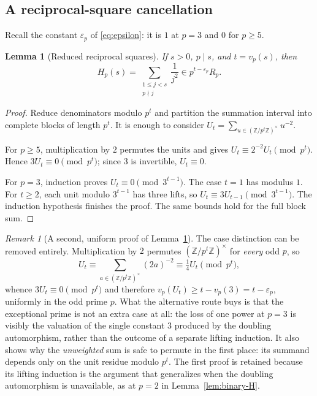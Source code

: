 \documentclass[11pt,a4paper]{article}
\numberwithin{equation}{section}
\newtheorem{lemma}[theorem]{Lemma}
\theoremstyle{definition}
\theoremstyle{remark}
\newtheorem{remark}[theorem]{Remark}
\newcommand{\Z}{\mathbb Z}
\newcommand{\eps}{\varepsilon}
\begin{document}
\subsection{A reciprocal-square cancellation}
Recall the constant $\eps_p$ of \eqref{eq:epsilon}: it is $1$ at $p=3$ and
$0$ for $p\ge5$.

\begin{lemma}[Reduced reciprocal squares]\label{lem:squares}
If $s>0$, $p\mid s$, and $t=v_p(s)$, then
\begin{equation}\label{eq:Hs}
 H_p(s)=\sum_{\substack{1\le j<s\\p\nmid j}}\frac1{j^2}
 \in p^{t-\eps_p}R_p.
\end{equation}
\end{lemma}
\begin{proof}
Reduce denominators modulo $p^t$ and partition the summation interval into
complete blocks of length $p^t$. It is enough to consider
$U_t=\sum_{u\in(\Z/p^t\Z)^\times}u^{-2}$.

For $p\ge5$, multiplication by $2$ permutes the units and gives
$U_t\equiv 2^{-2}U_t\pmod{p^t}$. Hence $3U_t\equiv0\pmod{p^t}$; since
$3$ is invertible, $U_t\equiv0$.

For $p=3$, induction proves $U_t\equiv0\pmod{3^{t-1}}$. The case $t=1$
has modulus $1$. For $t\ge2$, each unit modulo $3^{t-1}$ has three lifts,
so $U_t\equiv3U_{t-1}\pmod{3^{t-1}}$. The induction hypothesis finishes
the proof. The same bounds hold for the full block sum.
\end{proof}

\begin{remark}[A second, uniform proof of Lemma~\ref{lem:squares}]
\label{rem:squares-alt}
The case distinction can be removed entirely. Multiplication by $2$ permutes
$(\Z/p^t\Z)^\times$ for \emph{every} odd $p$, so
\[
 U_t\equiv\sum_{a\in(\Z/p^t\Z)^\times}(2a)^{-2}
 \equiv\tfrac14U_t\pmod{p^t},
\]
whence $3U_t\equiv0\pmod{p^t}$ and therefore
$v_p(U_t)\ge t-v_p(3)=t-\eps_p$, uniformly in the odd prime $p$. What the
alternative route buys is that the exceptional prime is not an extra case at
all: the loss of one power at $p=3$ is visibly the valuation of the single
constant $3$ produced by the doubling automorphism, rather than the outcome
of a separate lifting induction. It also shows why the \emph{unweighted} sum
is safe to permute in the first place: its summand depends only on the unit
residue modulo $p^t$. The first proof is retained because its lifting
induction is the argument that generalizes when the doubling automorphism is
unavailable, as at $p=2$ in Lemma~\ref{lem:binary-H}.
\end{remark}
\end{document}
